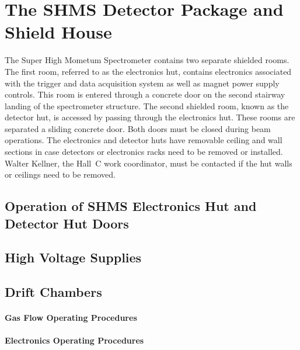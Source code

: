 
\section{The SHMS Detector Package and Shield House }

The Super High Mometum Spectrometer contains two separate shielded
rooms.  The first room, referred to as the electronics hut, contains
electronics associated with the trigger and data acquisition system as
well as magnet power supply controls.    This room is entered through a concrete
door on the second stairway landing of the spectrometer structure.
The second shielded room, known as the detector hut, is accessed by
passing through the electronics hut.  These rooms are separated a
sliding concrete door.  Both doors must be closed during beam
operations.  The electronics and detector huts have removable ceiling
and wall sections in case detectors or electronics racks need to be
removed or installed.  Walter Kellner, the Hall~C work coordinator,  
must be contacted if the hut walls or ceilings need to be removed.

\subsection{Operation of SHMS Electronics Hut and Detector Hut Doors}


\subsection{High Voltage Supplies}

\subsection{Drift Chambers}

\paragraph{Gas Flow Operating Procedures}

\paragraph{Electronics Operating Procedures}


